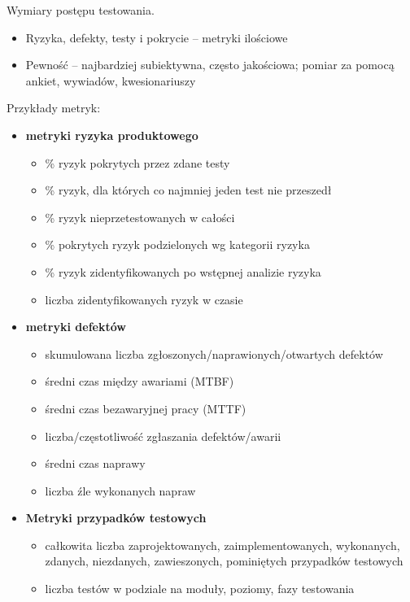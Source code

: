 \documentclass[../main.tex]{subfiles}
\begin{document}
    Wymiary postępu testowania.
    \begin{itemize}
        \item Ryzyka, defekty, testy i pokrycie – metryki ilościowe
        \item Pewność – najbardziej subiektywna, często jakościowa; pomiar za pomocą ankiet, wywiadów, kwesionariuszy
    \end{itemize}

    Przykłady metryk:
    \begin{itemize}
        \item \textbf{metryki ryzyka produktowego}
        \begin{itemize}
            \item \% ryzyk pokrytych przez zdane testy
            \item \% ryzyk, dla których co najmniej jeden test nie przeszedł
            \item \% ryzyk nieprzetestowanych w całości
            \item \% pokrytych ryzyk podzielonych wg kategorii ryzyka
            \item \% ryzyk zidentyfikowanych po wstępnej analizie ryzyka
            \item liczba zidentyfikowanych ryzyk w czasie
        \end{itemize}
        \item \textbf{metryki defektów}
        \begin{itemize}
            \item skumulowana liczba zgłoszonych/naprawionych/otwartych defektów
            \item średni czas między awariami (MTBF)
            \item średni czas bezawaryjnej pracy (MTTF)
            \item liczba/częstotliwość zgłaszania defektów/awarii
            \item średni czas naprawy
            \item liczba źle wykonanych napraw
        \end{itemize}
        \item \textbf{Metryki przypadków testowych}
        \begin{itemize}
            \item całkowita liczba zaprojektowanych, zaimplementowanych, wykonanych, zdanych, niezdanych, zawieszonych, pominiętych przypadków testowych
            \item liczba testów w podziale na moduły, poziomy, fazy testowania

\end{itemize}
\end{itemize}
\end{document}
